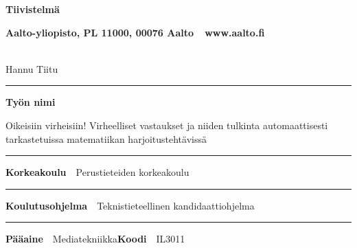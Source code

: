 
\newpage
{}
{}


\begin{spacing}{.88}

{\parindent0pt %

{\fontsize{13.9pt}{13.9pt}\selectfont
\vspace{-8.9mm}\hfill{\bfseries\sffamily\lsstyle Tiivistelmä}}

{\fontsize{9.48pt}{9.48pt}\selectfont
\vspace{.9mm}\hfill{\bfseries\sffamily\lsstyle Aalto-yliopisto, PL 11000, 00076 Aalto~~\textcolor{aaltoGray}{www.aalto.fi}}}

\\
{\small Hannu Tiitu}

\vspace{-2.4mm}\rule{\textwidth}{.75pt}

{\fontsize{10.5pt}{10.5pt}\bfseries\sffamily\lsstyle Työn nimi}\\
\parbox[t]{\textwidth}{\raggedright\small Oikeisiin virheisiin! Virheelliset vastaukset ja niiden tulkinta automaattisesti tarkastetuissa matematiikan harjoitustehtävissä}

\vspace{.5mm}\rule{\textwidth}{.75pt}

{\fontsize{10.5pt}{10.5pt}\bfseries\sffamily\lsstyle Korkeakoulu}~~{\small Perustieteiden korkeakoulu}

\vspace{-2.4mm}\rule{\textwidth}{.75pt}

{\fontsize{10.5pt}{10.5pt}\bfseries\sffamily\lsstyle Koulutusohjelma}~~{\small Teknistieteellinen kandidaattiohjelma}

\vspace{-2.4mm}\rule{\textwidth}{.75pt}

{\fontsize{10.5pt}{10.5pt}\bfseries\sffamily\lsstyle Pääaine}~~{\small Mediatekniikka}\hfill{\fontsize{10.5pt}{10.5pt}\bfseries\sffamily\lsstyle Koodi}~~{\small IL3011}

}
\end{spacing}
